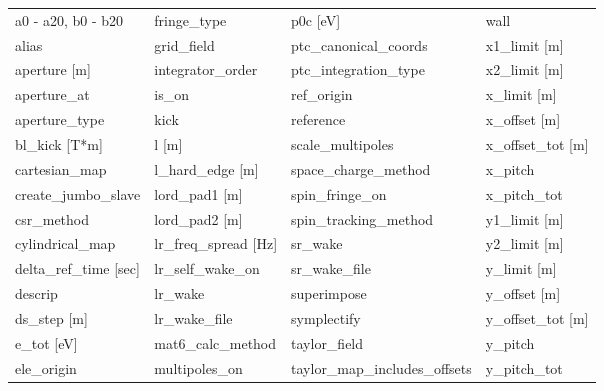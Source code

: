  \begin{tabular}{llll} \toprule
a0 - a20, b0 - b20             & fringe_type                    & p0c [eV]                       & wall                           \\
alias                          & grid_field                     & ptc_canonical_coords           & x1_limit [m]                   \\
aperture [m]                   & integrator_order               & ptc_integration_type           & x2_limit [m]                   \\
aperture_at                    & is_on                          & ref_origin                     & x_limit [m]                    \\
aperture_type                  & kick                           & reference                      & x_offset [m]                   \\
bl_kick [T*m]                  & l [m]                          & scale_multipoles               & x_offset_tot [m]               \\
cartesian_map                  & l_hard_edge [m]                & space_charge_method            & x_pitch                        \\
create_jumbo_slave             & lord_pad1 [m]                  & spin_fringe_on                 & x_pitch_tot                    \\
csr_method                     & lord_pad2 [m]                  & spin_tracking_method           & y1_limit [m]                   \\
cylindrical_map                & lr_freq_spread [Hz]            & sr_wake                        & y2_limit [m]                   \\
delta_ref_time [sec]           & lr_self_wake_on                & sr_wake_file                   & y_limit [m]                    \\
descrip                        & lr_wake                        & superimpose                    & y_offset [m]                   \\
ds_step [m]                    & lr_wake_file                   & symplectify                    & y_offset_tot [m]               \\
e_tot [eV]                     & mat6_calc_method               & taylor_field                   & y_pitch                        \\
ele_origin                     & multipoles_on                  & taylor_map_includes_offsets    & y_pitch_tot                    \\

\end{tabular}
